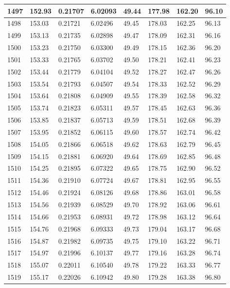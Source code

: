\documentclass[12pt,a4paper,twoside]{article}
\begin{document}
\begin{center}
\begin{longtable}{l l l l | l l l l}
1497 & 152.93 & 0.21707 & 6.02093 & 49.44 & 177.98 & 162.20 & 96.10 \\ \hline
1498 & 153.03 & 0.21721 & 6.02496 & 49.45 & 178.03 & 162.25 & 96.13 \\ \hline
1499 & 153.13 & 0.21735 & 6.02898 & 49.47 & 178.09 & 162.31 & 96.16 \\ \hline
1500 & 153.23 & 0.21750 & 6.03300 & 49.49 & 178.15 & 162.36 & 96.20 \\ \hline
1501 & 153.33 & 0.21765 & 6.03702 & 49.50 & 178.21 & 162.41 & 96.23 \\ \hline
1502 & 153.44 & 0.21779 & 6.04104 & 49.52 & 178.27 & 162.47 & 96.26 \\ \hline
1503 & 153.54 & 0.21793 & 6.04507 & 49.54 & 178.33 & 162.52 & 96.29 \\ \hline
1504 & 153.64 & 0.21808 & 6.04909 & 49.55 & 178.39 & 162.58 & 96.32 \\ \hline
1505 & 153.74 & 0.21823 & 6.05311 & 49.57 & 178.45 & 162.63 & 96.36 \\ \hline
1506 & 153.85 & 0.21837 & 6.05713 & 49.59 & 178.51 & 162.68 & 96.39 \\ \hline
1507 & 153.95 & 0.21852 & 6.06115 & 49.60 & 178.57 & 162.74 & 96.42 \\ \hline
1508 & 154.05 & 0.21866 & 6.06518 & 49.62 & 178.63 & 162.79 & 96.45 \\ \hline
1509 & 154.15 & 0.21881 & 6.06920 & 49.64 & 178.69 & 162.85 & 96.48 \\ \hline
1510 & 154.25 & 0.21895 & 6.07322 & 49.65 & 178.75 & 162.90 & 96.52 \\ \hline
1511 & 154.36 & 0.21910 & 6.07724 & 49.67 & 178.81 & 162.95 & 96.55 \\ \hline
1512 & 154.46 & 0.21924 & 6.08126 & 49.68 & 178.86 & 163.01 & 96.58 \\ \hline
1513 & 154.56 & 0.21939 & 6.08529 & 49.70 & 178.92 & 163.06 & 96.61 \\ \hline
1514 & 154.66 & 0.21953 & 6.08931 & 49.72 & 178.98 & 163.12 & 96.64 \\ \hline
1515 & 154.76 & 0.21968 & 6.09333 & 49.73 & 179.04 & 163.17 & 96.68 \\ \hline
1516 & 154.87 & 0.21982 & 6.09735 & 49.75 & 179.10 & 163.22 & 96.71 \\ \hline
1517 & 154.97 & 0.21996 & 6.10137 & 49.77 & 179.16 & 163.28 & 96.74 \\ \hline
1518 & 155.07 & 0.22011 & 6.10540 & 49.78 & 179.22 & 163.33 & 96.77 \\ \hline
1519 & 155.17 & 0.22026 & 6.10942 & 49.80 & 179.28 & 163.38 & 96.80 \\ \hline

\end{longtable}
\end{center}
\end{document}
